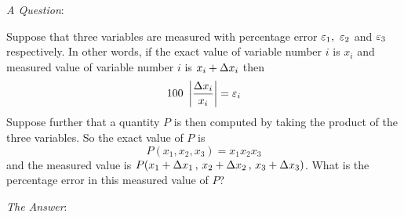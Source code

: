 \begin{eg}\label{eg errors in measurement}
\noindent\textit{A Question}:

Suppose that three variables are measured with percentage
error $\varepsilon_1,\ \varepsilon_2$ and $\varepsilon_3$ respectively. In other words,
if the exact value of  variable number $i$ is $x_i$ and measured value
of variable  number $i$ is $x_i+\Delta x_i$ then
\begin{equation*}
100\ \left|\frac{\Delta x_i}{x_i}\right|=\varepsilon_i
\end{equation*}
Suppose further that a quantity $P$ is then computed by taking the 
product of the three variables. So the exact value of $P$ is
\begin{equation*}
P(x_1,x_2,x_3)=x_1x_2x_3
\end{equation*}
and the measured value is $P(x_1+\Delta x_1\,,\,x_2+\Delta x_2\,,\,x_3+\Delta x_3)$.
What is the percentage error in this measured value of $P$?

\medskip
\noindent\textit{The Answer}:


\end{eg}
